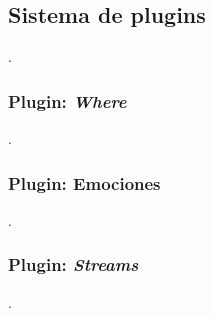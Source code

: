 \subsection{Sistema de plugins}
.

\subsubsection{Plugin: \textit{Where}}
.

\subsubsection{Plugin: Emociones}

.

\subsubsection{Plugin: \textit{Streams}}

.

